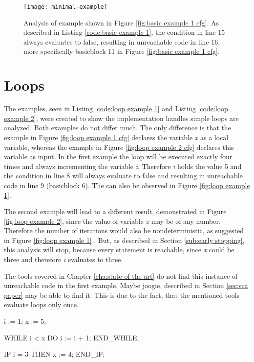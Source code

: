\begin{figure}[h!]
	\centering
	\texttt{[image: minimal-example]}
	\caption{Analysis of example shown in Figure \ref{fig:basic example 1 cfg}. As described in Listing \ref{code:basic example 1}, the condition in line 15 always evaluates to false, resulting in unreachable code in line 16, more specifically basicblock 11 in Figure \ref{fig:basic example 1 cfg}. }
	\label{fig:basic example 1}
\end{figure}

\section{Loops}
\label{sec:loops}
The examples, seen in Listing \ref{code:loop example 1} and Listing \ref{code:loop example 2}, were created to show the implementation handles simple loops are analyzed. Both examples do not differ much. The only difference is that the example in Figure \ref{fig:loop example 1 cfg} declares the variable \emph{x} as a local variable, whereas the example in Figure \ref{fig:loop example 2 cfg} declares this variable as input. 
In the first example the loop will be executed exactly four times and always incrementing the variable \emph{i}. Therefore \emph{i} holds the value 5 and the condition in line 8 will always evaluate to false and resulting in unreachable code in line 9 (basicblock 6). The can also be observed in Figure \ref{fig:loop example 1}.


The second example will lead to a different result, demonstrated in Figure \ref{fig:loop example 2}, since the value of variable \emph{x} may be of any number. Therefore the number of iterations would also be nondeterministic, as suggested in Figure \ref{fig:loop example 1} . But, as described in Section \ref{sub:early stopping}, this analysis will stop, because every statement is reachable, since \emph{x} could be three and therefore \emph{i} evaluates to three. 


The tools covered in Chapter \ref{cha:state of the art} do not find this instance of unreachable code in the first example. Maybe joogie, described in Section \ref{sec:sca paper} may be able to find it. This is due to the fact, that the mentioned tools evaluate loops only once.

\begin{program}[h!]
		\begin{GenericCode}
i := 1;
x := 5;
		
WHILE i < x DO
	i := i + 1;
END_WHILE;
		
IF i = 3 THEN
	x := 4;
END_IF;	\end{GenericCode}
\centering
\caption{A simple loop that increments a number. Since \emph{i} is dependent on the iterations, which are limited by and will be equal to \emph{x}, in this case 5, the condition in line 8 will never evaluate true.}
\label{code:loop example 1}
\end{program}


